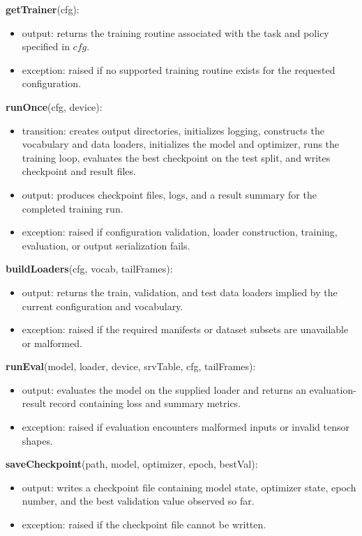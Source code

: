 \documentclass[12pt, titlepage]{article}
\begin{document}
\noindent \textbf{getTrainer}(cfg):
\begin{itemize}
    \item output: returns the training routine associated with the task and policy specified in $cfg$.
    \item exception: raised if no supported training routine exists for the requested configuration.
\end{itemize}

\noindent \textbf{runOnce}(cfg, device):
\begin{itemize}
    \item transition: creates output directories, initializes logging, constructs the vocabulary and data loaders, initializes the model and optimizer, runs the training loop, evaluates the best checkpoint on the test split, and writes checkpoint and result files.
    \item output: produces checkpoint files, logs, and a result summary for the completed training run.
    \item exception: raised if configuration validation, loader construction, training, evaluation, or output serialization fails.
\end{itemize}

\noindent \textbf{buildLoaders}(cfg, vocab, tailFrames):
\begin{itemize}
    \item output: returns the train, validation, and test data loaders implied by the current configuration and vocabulary.
    \item exception: raised if the required manifests or dataset subsets are unavailable or malformed.
\end{itemize}

\noindent \textbf{runEval}(model, loader, device, srvTable, cfg, tailFrames):
\begin{itemize}
    \item output: evaluates the model on the supplied loader and returns an evaluation-result record containing loss and summary metrics.
    \item exception: raised if evaluation encounters malformed inputs or invalid tensor shapes.
\end{itemize}

\noindent \textbf{saveCheckpoint}(path, model, optimizer, epoch, bestVal):
\begin{itemize}
    \item output: writes a checkpoint file containing model state, optimizer state, epoch number, and the best validation value observed so far.
    \item exception: raised if the checkpoint file cannot be written.
\end{itemize}
\end{document}
